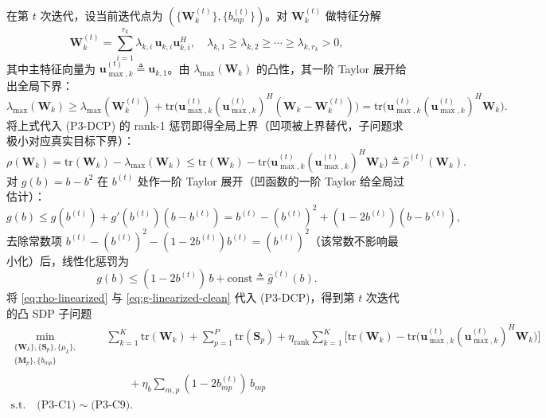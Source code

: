 \documentclass[12pt,a4paper]{article}
\newcommand{\vect}[1]{\mathbf{#1}}
\newcommand{\mat}[1]{\mathbf{#1}}
\newcommand{\tr}{\text{tr}}
\begin{document}
在第 $t$ 次迭代，设当前迭代点为 $(\{\mat{W}_k^{(t)}\}, \{b_{mp}^{(t)}\})$。对 $\mat{W}_k^{(t)}$ 做特征分解
\begin{equation}
\mat{W}_k^{(t)} = \sum_{i=1}^{r_k} \lambda_{k,i} \, \vect{u}_{k,i} \vect{u}_{k,i}^H, \quad \lambda_{k,1} \geq \lambda_{k,2} \geq \cdots \geq \lambda_{k,r_k} > 0,
\end{equation}
其中主特征向量为 $\vect{u}_{\max,k}^{(t)} \triangleq \vect{u}_{k,1}$。由 $\lambda_{\max}(\mat{W}_k)$ 的凸性，其一阶 Taylor 展开给出全局下界：
\begin{equation}\label{eq:lambda-lb}
\lambda_{\max}(\mat{W}_k) \geq \lambda_{\max}(\mat{W}_k^{(t)}) + \tr\Big( \vect{u}_{\max,k}^{(t)} (\vect{u}_{\max,k}^{(t)})^H (\mat{W}_k - \mat{W}_k^{(t)}) \Big) = \tr\Big( \vect{u}_{\max,k}^{(t)} (\vect{u}_{\max,k}^{(t)})^H \mat{W}_k \Big).
\end{equation}
将上式代入 (P3-DCP) 的 rank-1 惩罚即得全局上界（凹项被上界替代，子问题求极小对应真实目标下界）：
\begin{equation}\label{eq:rho-linearized}
\rho(\mat{W}_k) = \tr(\mat{W}_k) - \lambda_{\max}(\mat{W}_k) \leq \tr(\mat{W}_k) - \tr\Big( \vect{u}_{\max,k}^{(t)} (\vect{u}_{\max,k}^{(t)})^H \mat{W}_k \Big) \triangleq \hat{\rho}^{(t)}(\mat{W}_k).
\end{equation}
对 $g(b) = b - b^2$ 在 $b^{(t)}$ 处作一阶 Taylor 展开（凹函数的一阶 Taylor 给全局过估计）：
\begin{equation}\label{eq:g-linearized}
g(b) \leq g(b^{(t)}) + g'(b^{(t)})(b - b^{(t)}) = b^{(t)} - (b^{(t)})^2 + (1 - 2b^{(t)})(b - b^{(t)}),
\end{equation}
去除常数项 $b^{(t)} - (b^{(t)})^2 - (1 - 2b^{(t)}) b^{(t)} = (b^{(t)})^2$（该常数不影响最小化）后，线性化惩罚为
\begin{equation}\label{eq:g-linearized-clean}
g(b) \leq (1 - 2b^{(t)}) \, b + \text{const} \triangleq \hat{g}^{(t)}(b).
\end{equation}
将 \eqref{eq:rho-linearized} 与 \eqref{eq:g-linearized-clean} 代入 (P3-DCP)，得到第 $t$ 次迭代的凸 SDP 子问题
\begin{equation}\label{eq:p3-sca}
\begin{aligned}
\min_{\substack{\{\mat{W}_k\}, \{\mat{S}_p\}, \{\mu_k\}, \\ \{\mat{M}_p\}, \{b_{mp}\}}} \quad & \sum_{k=1}^K \tr(\mat{W}_k) + \sum_{p=1}^P \tr(\mat{S}_p) + \eta_{\text{rank}} \sum_{k=1}^K \Big[ \tr(\mat{W}_k) - \tr\big( \vect{u}_{\max,k}^{(t)} (\vect{u}_{\max,k}^{(t)})^H \mat{W}_k \big) \Big] \\
& \qquad + \eta_b \sum_{m, p} (1 - 2b_{mp}^{(t)}) \, b_{mp} \\
\text{s.t.} \quad \text{(P3-C1)}\sim\text{(P3-C9)}.
\end{aligned}
\end{equation}
\end{document}
